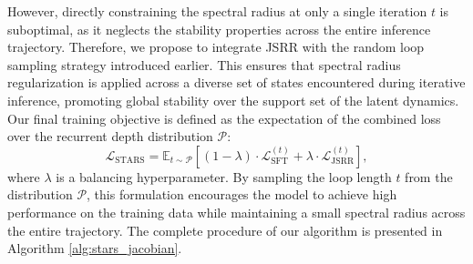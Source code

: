 However, directly constraining the spectral radius at only a single iteration \( t \) is suboptimal, as it neglects the stability properties across the entire inference trajectory. Therefore, we propose to integrate JSRR with the random loop sampling strategy introduced earlier. This ensures that spectral radius regularization is applied across a diverse set of states encountered during iterative inference, promoting global stability over the support set of the latent dynamics. Our final training objective is defined as the expectation of the combined loss over the recurrent depth distribution \( \mathcal{P} \):
\begin{equation}
    \mathcal{L}_{\text{STARS}} = \mathbb{E}_{t \sim \mathcal{P}} \left[ (1-\lambda) \cdot \mathcal{L}_{\text{SFT}}^{(t)} + \lambda \cdot \mathcal{L}_{\text{JSRR}}^{(t)} \right],
\end{equation}
where \(\lambda\) is a balancing hyperparameter. By sampling the loop length \(t\) from the distribution \(\mathcal{P}\), this formulation encourages the model to achieve high performance on the training data while maintaining a small spectral radius across the entire trajectory. 
The complete procedure of our algorithm is presented in Algorithm \ref{alg:stars_jacobian}.



